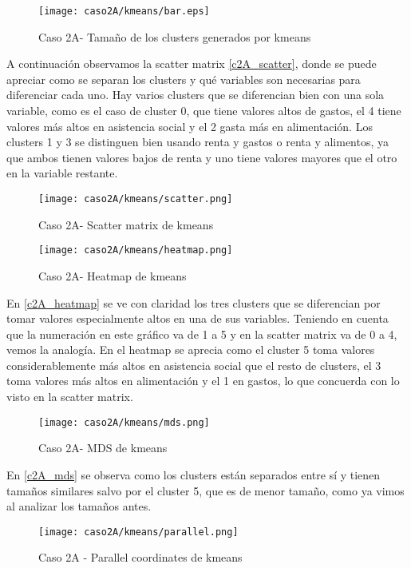 \begin{figure}[H]
\caption{Caso 2A- Tamaño de los clusters generados por kmeans}
\label{c2A_tam}
\texttt{[image: caso2A/kmeans/bar.eps]}
\end{figure}

A continuación observamos la scatter matrix \eqref{c2A_scatter}, donde se puede apreciar como se separan los clusters y qué variables son necesarias para diferenciar cada uno. Hay varios clusters que se diferencian bien con una sola variable, como es el caso de cluster 0, que tiene valores altos de gastos, el 4 tiene valores más altos en asistencia social y el 2 gasta más en alimentación. Los clusters 1 y 3 se distinguen bien usando renta y gastos o renta y alimentos, ya que ambos tienen valores bajos de renta y uno tiene valores mayores que el otro en la variable restante.

\begin{figure}[H]
\caption{Caso 2A- Scatter matrix de kmeans}
\label{c2A_scatter}
\texttt{[image: caso2A/kmeans/scatter.png]}
\end{figure}


\begin{figure}[H]
\caption{Caso 2A- Heatmap de kmeans}
\label{c2A_heatmap}
\texttt{[image: caso2A/kmeans/heatmap.png]}
\end{figure}

En \eqref{c2A_heatmap} se ve con claridad los tres clusters que se diferencian por tomar valores especialmente altos en una de sus variables. Teniendo en cuenta que la numeración en este gráfico va de 1 a 5 y en la scatter matrix va de 0 a 4, vemos la analogía. En el heatmap se aprecia como el cluster 5 toma valores considerablemente más altos en asistencia social que el resto de clusters, el 3 toma valores más altos en alimentación y el 1 en gastos, lo que concuerda con lo visto en la scatter matrix.


\begin{figure}[H]
\caption{Caso 2A- MDS de kmeans}
\label{c2A_mds}
\texttt{[image: caso2A/kmeans/mds.png]}
\end{figure}

En \eqref{c2A_mds} se observa como los clusters están separados entre sí y tienen tamaños similares salvo por el cluster 5, que es de menor tamaño, como ya vimos al analizar los tamaños antes.

\begin{figure}[H]
\caption{Caso 2A - Parallel coordinates de kmeans}
\label{c2A_parallel}
\texttt{[image: caso2A/kmeans/parallel.png]}
\end{figure}

